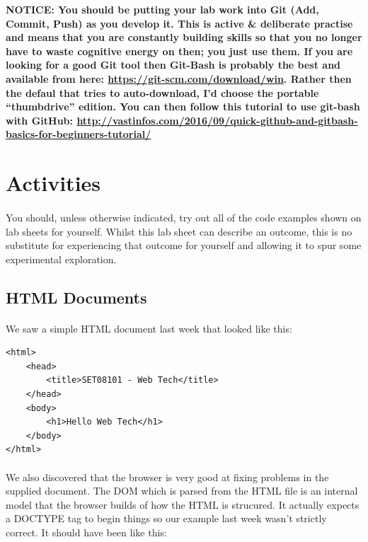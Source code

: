 \documentclass[10pt, a4paper, twosize]{article}
\begin{document}
\begin{framed}
{\bf{NOTICE:} You should be putting your lab work into Git (Add, Commit, Push) as you develop it. This is active \& deliberate practise and means that you are constantly building skills so that you no longer have to waste cognitive energy on then; you just use them. If you are looking for a good Git tool then Git-Bash is probably the best and available from here: \url{https://git-scm.com/download/win}. Rather then the defaul that tries to auto-download, I'd choose the portable ``thumbdrive'' edition. You can then follow this tutorial to use git-bash with GitHub: \url{http://vastinfos.com/2016/09/quick-github-and-gitbash-basics-for-beginners-tutorial/} }
\end{framed}


\section{Activities}

\paragraph{} You should, unless otherwise indicated, try out all of the code examples shown on lab sheets for yourself. Whilst this lab sheet can describe an outcome, this is no substitute for experiencing that outcome for yourself and allowing it to spur some experimental exploration.

\subsection{HTML Documents}
\paragraph{} We saw a simple HTML document last week that looked like this:

\begin{lstlisting}
<html>
    <head>
        <title>SET08101 - Web Tech</title>
    </head>
    <body>
        <h1>Hello Web Tech</h1>
    </body>
</html>
\end{lstlisting}

\paragraph{} We also discovered that the browser is very good at fixing problems in the supplied document. The DOM which is parsed from the HTML file is an internal model that the browser builds of how the HTML is strucured. It actually expects a DOCTYPE tag to begin things so our example last week wasn't strictly correct. It should have been like this:
\end{document}
